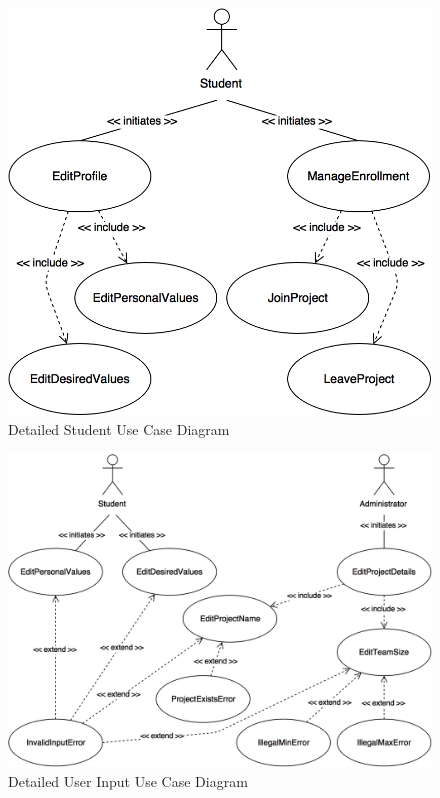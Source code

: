 \documentclass[12pt,letterpaper]{article}
\begin{document}
\begin{figure}[H]
	\centering{}
	\includegraphics[scale=0.3]{imgs/detailed-student-use-case-diagram.png}
	\caption{Detailed Student Use Case Diagram}
\end{figure}

\begin{figure}[H]
	\centering{}
	\includegraphics[scale=0.3]{imgs/detailed-user-input-use-case-diagram.png}
	\caption{Detailed User Input Use Case Diagram}
\end{figure}
\end{document}
